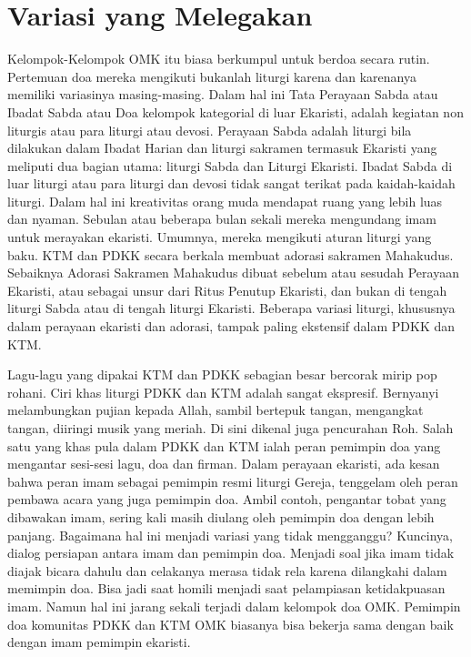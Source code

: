 \section*{Variasi yang Melegakan}

Kelompok-Kelompok OMK itu  biasa berkumpul untuk berdoa secara rutin.  Pertemuan doa mereka mengikuti bukanlah liturgi karena dan karenanya memiliki variasinya masing-masing.  Dalam hal ini Tata Perayaan Sabda atau Ibadat Sabda atau Doa kelompok kategorial di luar Ekaristi, adalah kegiatan non liturgis atau para liturgi atau devosi. Perayaan Sabda adalah liturgi bila dilakukan dalam Ibadat Harian dan liturgi sakramen termasuk Ekaristi yang meliputi dua bagian utama: liturgi Sabda dan Liturgi Ekaristi. Ibadat Sabda di luar liturgi atau para liturgi dan devosi tidak sangat terikat pada kaidah-kaidah liturgi. Dalam hal ini kreativitas orang muda mendapat ruang yang lebih luas dan nyaman. Sebulan atau beberapa bulan sekali mereka mengundang imam untuk merayakan ekaristi. Umumnya, mereka mengikuti aturan liturgi yang baku. KTM dan PDKK  secara berkala membuat adorasi sakramen Mahakudus. Sebaiknya Adorasi Sakramen Mahakudus dibuat sebelum atau sesudah Perayaan Ekaristi, atau sebagai unsur dari Ritus Penutup Ekaristi, dan bukan di tengah liturgi Sabda atau di tengah liturgi Ekaristi.  Beberapa variasi liturgi, khususnya dalam perayaan ekaristi dan adorasi, tampak paling ekstensif dalam PDKK dan KTM.

Lagu-lagu yang dipakai KTM dan PDKK sebagian besar bercorak mirip pop rohani. Ciri khas liturgi PDKK dan KTM adalah sangat ekspresif. Bernyanyi melambungkan pujian kepada Allah, sambil bertepuk tangan, mengangkat tangan, diiringi musik yang meriah. Di sini dikenal juga pencurahan Roh. Salah satu yang khas pula dalam PDKK dan KTM ialah peran pemimpin doa yang mengantar sesi-sesi lagu, doa dan firman. Dalam perayaan ekaristi, ada kesan bahwa peran imam  sebagai pemimpin resmi liturgi Gereja, tenggelam oleh peran pembawa acara yang juga pemimpin doa. Ambil contoh, pengantar tobat yang dibawakan imam, sering kali masih diulang oleh pemimpin doa dengan lebih panjang. Bagaimana hal ini menjadi variasi yang tidak mengganggu? Kuncinya, dialog persiapan antara imam dan pemimpin doa.  Menjadi soal jika imam tidak diajak bicara dahulu  dan celakanya merasa tidak rela karena dilangkahi dalam memimpin doa. Bisa jadi saat homili menjadi saat pelampiasan ketidakpuasan imam. Namun hal ini jarang sekali terjadi dalam kelompok doa OMK. Pemimpin doa komunitas PDKK dan KTM OMK biasanya bisa bekerja sama dengan baik dengan imam pemimpin ekaristi.

